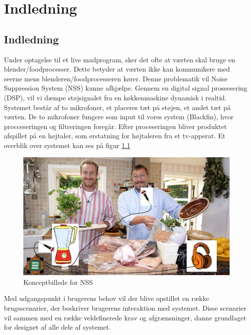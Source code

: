 \graphicspath{{Chapters/Indledning/}}

\chapter{Indledning}
\section{Indledning}
Under optagelse til et live madprogram, sker det ofte at værten skal bruge en blender/foodprocesser. Dette betyder at værten ikke kan kommunikere med seerne mens blenderen/foodprocesseren kører. Denne problematik vil Noise Suppression System (NSS) kunne afhjælpe. Gennem en digital signal prossesering (DSP), vil vi dæmpe støjsignalet fra en køkkenmaskine dynamisk i realtid. Systemet består af to mikrofoner, et placeres tæt på støjen, et andet tæt på værten. De to mikrofoner fungere som input til vores system (Blackfin), hvor procceseringen og filtreringen foregår. Efter proceseringen bliver produktet afspillet på en højtaler, som erstatning for højtaleren fra et tv-apperat. Et overblik over systemet kan ses på figur \ref{fig:konceptbillede}

\begin{figure}[H]
	\centering
	\includegraphics[width = 400pt]{Img/Konceptbillede}
	\caption{Konceptbillede for NSS}
	\label{fig:konceptbillede}
\end{figure}

Med udgangspunkt i brugerens behov vil der blive opstillet en række brugsscenarier, der beskriver brugerens interaktion med systemet. Disse scenarier vil sammen med en række veldefinerede krav og afgrænsninger, danne grundlaget for designet af alle dele af systemet.  \\ 

